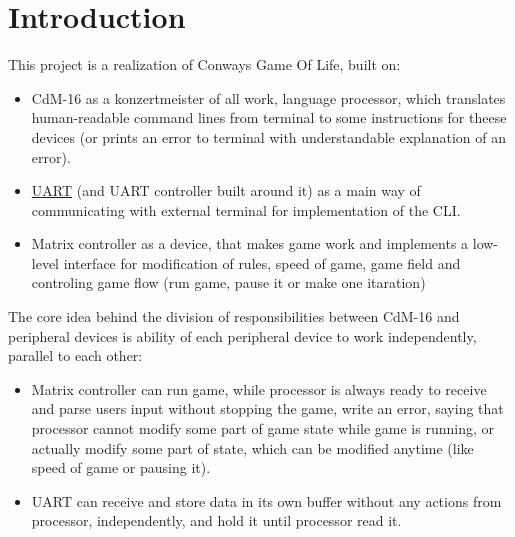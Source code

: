 \chapter*{Introduction}

This project is a realization of Conways Game Of Life, built on:

\begin{itemize}
	\item CdM-16 as a konzertmeister of all work, language processor, which translates human-readable command lines from terminal to some instructions for theese devices (or prints an error to terminal with understandable explanation of an error).
	\item \href{https://github.com/cdm-processors/logisim-uart}{UART} (and UART controller built around it) as a main way of communicating with external terminal for implementation of the CLI.
	\item Matrix controller as a device, that makes game work and implements a low-level interface for modification of rules, speed of game, game field and controling game flow (run game, pause it or make one itaration)
\end{itemize}

The core idea behind the division of responsibilities between CdM-16 and peripheral devices is ability of each peripheral device to work independently, parallel to each other:

\begin{itemize}
	\item Matrix controller can run game, while processor is always ready to receive and parse users input without stopping the game, write an error, saying that processor cannot modify some part of game state while game is running, or actually modify some part of state, which can be modified anytime (like speed of game or pausing it).
	\item UART can receive and store data in its own buffer without any actions from processor, independently, and hold it until processor read it.
\end{itemize}
